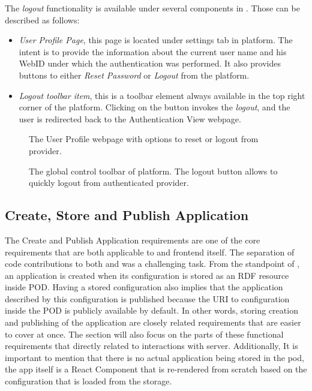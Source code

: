 The \textit{logout} functionality is available under several components in \lpa{}. Those can be described as follows:
\begin{itemize}
    \item \textit{User Profile Page}, this page is located under settings tab in \lpa{} platform. The intent is to provide the information about the current user name and his WebID under which the authentication was performed. It also provides buttons to either \textit{Reset Password} or \textit{Logout} from the platform.
    \item \textit{Logout toolbar item}, this is a toolbar element always available in the top right corner of the platform. Clicking on the button invokes the \textit{logout}, and the user is redirected back to the Authentication View webpage.
\end{itemize}

\begin{figure}[hbt]
  \caption{The User Profile webpage with options to reset or logout from \solid{} provider.}
  \label{fig:solid_user_profile_login_webpage}
\endminipage\hfill
{}
  \caption{The global control toolbar of \lpa{} platform. The logout button allows to quickly logout from authenticated \solid{} provider.}
  \label{fig:solid_toolbar_logout}
\endminipage\hfill
\end{figure}

\subsection{Create, Store and Publish Application}

The Create and Publish Application requirements are one of the core requirements that are both applicable to \lpas{} and \lpa{} frontend itself. The separation of code contributions to both \lpa{} and \lpas{} was a challenging task. From the standpoint of \lpas{}, an application is created when its configuration is stored as an RDF resource inside \solid{} POD. Having a stored configuration also implies that the application described by this configuration is published because the URI to configuration inside the POD is publicly available by default. In other words, storing creation and publishing of the application are closely related requirements that are easier to cover at once. The section will also focus on the parts of these functional requirements that directly related to interactions with \solid{} server. Additionally, It is important to mention that there is no actual application being stored in the \solid{} pod, the app itself is a React Component that is re-rendered from scratch based on the \lpa{} configuration that is loaded from the storage. 


